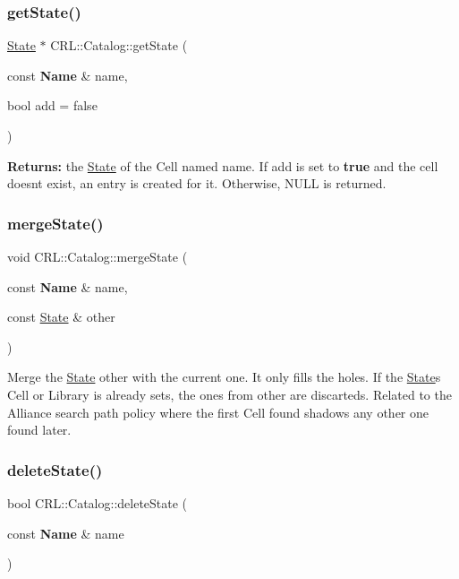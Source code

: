 \subsubsection{\texorpdfstring{get\+State()}{getState()}}
{\footnotesize\ttfamily \hyperlink{classCRL_1_1Catalog_1_1State}{State} $\ast$ C\+R\+L\+::\+Catalog\+::get\+State (\begin{DoxyParamCaption}\item[{const \textbf{ Name} \&}]{name,  }\item[{bool}]{add = {\ttfamily false} }\end{DoxyParamCaption})}

{\bfseries Returns\+:} the \hyperlink{classCRL_1_1Catalog_1_1State}{State} of the Cell named {\ttfamily name}. If {\ttfamily add} is set to {\bfseries true} and the cell doesn\textquotesingle{}t exist, an entry is created for it. Otherwise, N\+U\+LL is returned. \mbox{\label{classCRL_1_1Catalog_afe3ea2153684ed8df029ee896cef6608}} 
\subsubsection{\texorpdfstring{merge\+State()}{mergeState()}}
{\footnotesize\ttfamily void C\+R\+L\+::\+Catalog\+::merge\+State (\begin{DoxyParamCaption}\item[{const \textbf{ Name} \&}]{name,  }\item[{const \hyperlink{classCRL_1_1Catalog_1_1State}{State} \&}]{other }\end{DoxyParamCaption})}

Merge the \hyperlink{classCRL_1_1Catalog_1_1State}{State} {\ttfamily other} with the current one. It only fills the holes. If the \hyperlink{classCRL_1_1Catalog_1_1State}{State}\textquotesingle{}s Cell or Library is already sets, the ones from {\ttfamily other} are discarteds. Related to the Alliance search path policy where the first Cell found shadows any other one found later. \mbox{\label{classCRL_1_1Catalog_ada5b55e7926764fc9c7f5b7d4e6c2cdc}} 
\subsubsection{\texorpdfstring{delete\+State()}{deleteState()}}
{\footnotesize\ttfamily bool C\+R\+L\+::\+Catalog\+::delete\+State (\begin{DoxyParamCaption}\item[{const \textbf{ Name} \&}]{name }\end{DoxyParamCaption})}

